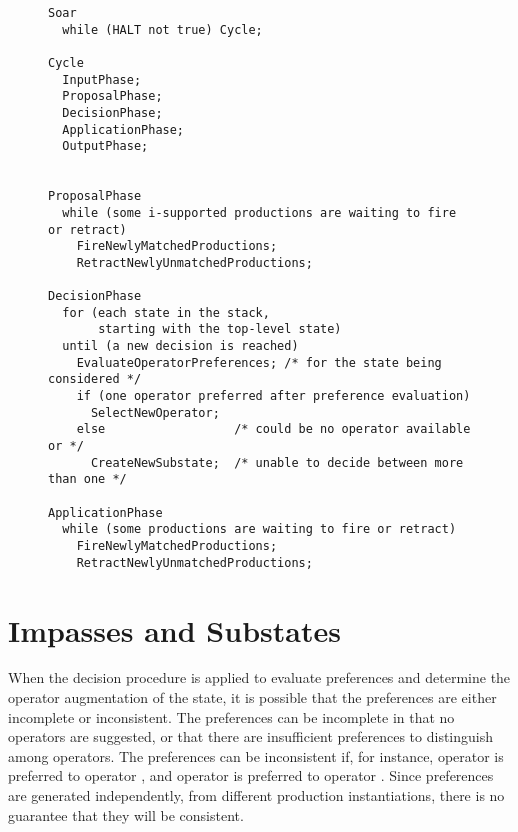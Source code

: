 \begin{figure}
\begin{verbatim}
Soar
  while (HALT not true) Cycle;
  
Cycle
  InputPhase;
  ProposalPhase;
  DecisionPhase;
  ApplicationPhase;
  OutputPhase;


ProposalPhase
  while (some i-supported productions are waiting to fire or retract)
    FireNewlyMatchedProductions;
    RetractNewlyUnmatchedProductions;

DecisionPhase
  for (each state in the stack, 
       starting with the top-level state)
  until (a new decision is reached)
    EvaluateOperatorPreferences; /* for the state being considered */
    if (one operator preferred after preference evaluation)
      SelectNewOperator;
    else                  /* could be no operator available or */
      CreateNewSubstate;  /* unable to decide between more than one */

ApplicationPhase
  while (some productions are waiting to fire or retract)
    FireNewlyMatchedProductions;
    RetractNewlyUnmatchedProductions;
\end{verbatim}

\label{fig:pseudocode}
\end{figure}

\section{Impasses and Substates}
\label{ARCH-impasses}

When the decision procedure is applied to evaluate preferences and determine
the operator augmentation of the state, it is possible that the preferences are 
either
incomplete or inconsistent.
The preferences can be incomplete in that no  operators are 
suggested, or that there are insufficient preferences to distinguish among
 operators. The preferences can be inconsistent if, for instance, 
operator
 is preferred to operator , and operator  is preferred 
to operator . Since preferences are generated independently,
from different production instantiations, there is no guarantee that
they will be consistent.

